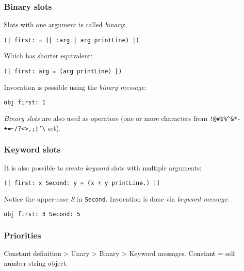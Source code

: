 \documentclass[10pt]{article}
\begin{document}
\begin{multicols*}{3}
\subsubsection{Binary slots}

Slots with one argument is called \textit{binary}:

\begin{lstlisting}
(| first: = (| :arg | arg printLine) |)
\end{lstlisting}

Which has shorter equivalent:

\begin{lstlisting}
(| first: arg = (arg printLine) |)
\end{lstlisting}

Invocation is possible using the \textit{binary message}:

\begin{lstlisting}
obj first: 1
\end{lstlisting}

\textit{Binary slots} are also used as operators (one or more characters from \texttt{!@\#\$\%\^{}\&*-+=\textasciitilde/?\textless\textgreater,;|'\textbackslash{}} set).



\subsubsection{Keyword slots}

It is also possible to create \textit{keyword} slots with multiple arguments:

\begin{lstlisting}
(| first: x Second: y = (x + y printLine.) |)
\end{lstlisting}

Notice the upper-case \textit{S} in \texttt{Second}. Invocation is done via \textit{keyword message}:

\begin{lstlisting}
obj first: 3 Second: 5
\end{lstlisting}



\subsubsection{Priorities}

Constant definition \textgreater{} Unary \textgreater{} Binary \textgreater{} Keyword messages. Constant = self \textbar{} number \textbar{} string \textbar{} object.





\end{multicols*}
\end{document}

